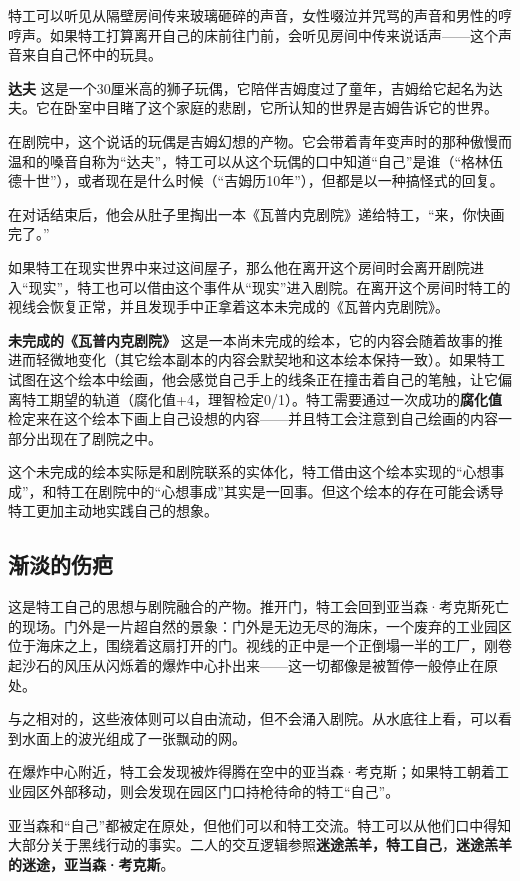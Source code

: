 特工可以听见从隔壁房间传来玻璃砸碎的声音，女性啜泣并咒骂的声音和男性的哼哼声。如果特工打算离开自己的床前往门前，会听见房间中传来说话声——这个声音来自自己怀中的玩具。

\textbf{达夫}
这是一个30厘米高的狮子玩偶，它陪伴吉姆度过了童年，吉姆给它起名为达夫。它在卧室中目睹了这个家庭的悲剧，它所认知的世界是吉姆告诉它的世界。

在剧院中，这个说话的玩偶是吉姆幻想的产物。它会带着青年变声时的那种傲慢而温和的嗓音自称为“达夫”，特工可以从这个玩偶的口中知道“自己”是谁（“格林伍德十世”），或者现在是什么时候（“吉姆历10年”），但都是以一种搞怪式的回复。

在对话结束后，他会从肚子里掏出一本《瓦普内克剧院》递给特工，“来，你快画完了。”

如果特工在现实世界中来过这间屋子，那么他在离开这个房间时会离开剧院进入“现实”，特工也可以借由这个事件从“现实”进入剧院。在离开这个房间时特工的视线会恢复正常，并且发现手中正拿着这本未完成的《瓦普内克剧院》。

\textbf{未完成的《瓦普内克剧院》}
这是一本尚未完成的绘本，它的内容会随着故事的推进而轻微地变化（其它绘本副本的内容会默契地和这本绘本保持一致）。如果特工试图在这个绘本中绘画，他会感觉自己手上的线条正在撞击着自己的笔触，让它偏离特工期望的轨道（腐化值+4，理智检定0/1）。特工需要通过一次成功的\textbf{腐化值}检定来在这个绘本下画上自己设想的内容——并且特工会注意到自己绘画的内容一部分出现在了剧院之中。

这个未完成的绘本实际是和剧院联系的实体化，特工借由这个绘本实现的“心想事成”，和特工在剧院中的“心想事成”其实是一回事。但这个绘本的存在可能会诱导特工更加主动地实践自己的想象。

\subsection{渐淡的伤疤}
这是特工自己的思想与剧院融合的产物。推开门，特工会回到亚当森·考克斯死亡的现场。门外是一片超自然的景象：门外是无边无尽的海床，一个废弃的工业园区位于海床之上，围绕着这扇打开的门。视线的正中是一个正倒塌一半的工厂，刚卷起沙石的风压从闪烁着的爆炸中心扑出来——这一切都像是被暂停一般停止在原处。

与之相对的，这些液体则可以自由流动，但不会涌入剧院。从水底往上看，可以看到水面上的波光组成了一张飘动的网。

在爆炸中心附近，特工会发现被炸得腾在空中的亚当森·考克斯；如果特工朝着工业园区外部移动，则会发现在园区门口持枪待命的特工“自己”。

亚当森和“自己”都被定在原处，但他们可以和特工交流。特工可以从他们口中得知大部分关于黑线行动的事实。二人的交互逻辑参照\textbf{迷途羔羊，特工自己}，\textbf{迷途羔羊的迷途，亚当森·考克斯}。

